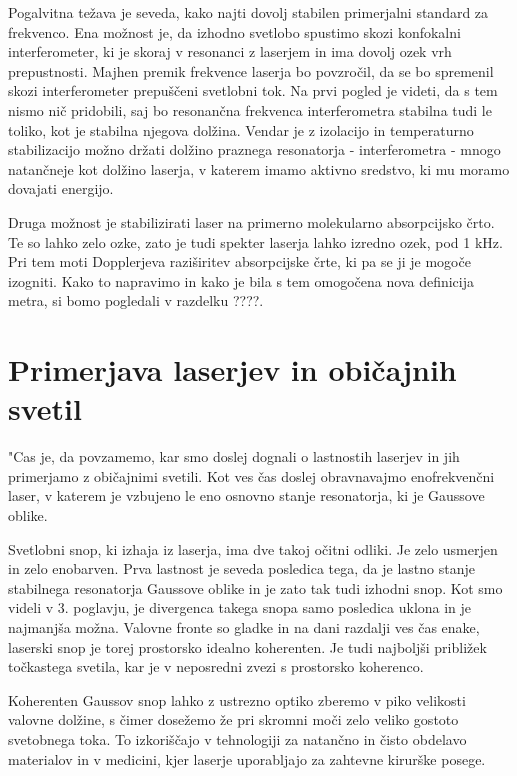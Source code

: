 Pogalvitna težava je seveda, kako najti dovolj stabilen primerjalni
standard za frekvenco. Ena možnost je, da izhodno svetlobo spustimo skozi
konfokalni interferometer, ki je skoraj v resonanci z laserjem in ima dovolj
ozek vrh prepustnosti. Majhen premik frekvence laserja bo povzročil, da se
bo spremenil skozi interferometer prepuščeni svetlobni tok. Na prvi pogled
je videti, da s tem nismo nič pridobili, saj bo resonančna frekvenca
interferometra stabilna tudi le toliko, kot je stabilna njegova dolžina.
Vendar je z izolacijo in temperaturno stabilizacijo možno držati dolžino
praznega resonatorja - interferometra - mnogo natančneje kot dolžino
laserja, v katerem imamo aktivno sredstvo, ki mu moramo dovajati energijo.

Druga možnost je stabilizirati laser na primerno molekularno absorpcijsko
črto. Te so lahko zelo ozke, zato je tudi spekter laserja lahko izredno
ozek, pod 1 kHz. Pri tem moti Dopplerjeva raziširitev absorpcijske črte,
ki pa se ji je mogoče izogniti. Kako to napravimo in kako je bila s tem
omogočena nova definicija metra, si bomo pogledali v razdelku ????.

\section{Primerjava laserjev in običajnih svetil}

"Cas je, da povzamemo, kar smo doslej dognali o lastnostih laserjev in jih
primerjamo z običajnimi svetili. Kot ves čas doslej obravnavajmo
enofrekvenčni laser, v katerem je vzbujeno le eno osnovno stanje
resonatorja, ki je Gaussove oblike.

Svetlobni snop, ki izhaja iz laserja, ima dve takoj očitni odliki. Je zelo
usmerjen in zelo enobarven. Prva lastnost je seveda posledica tega, da je
lastno stanje stabilnega resonatorja Gaussove oblike in je zato tak tudi
izhodni snop. Kot smo videli v 3. poglavju, je divergenca takega snopa samo
posledica uklona in je najmanjša možna. Valovne fronte so gladke in na
dani razdalji ves čas enake, laserski snop je torej prostorsko idealno
koherenten. Je tudi najboljši približek točkastega svetila, kar je v
neposredni zvezi s prostorsko koherenco.

Koherenten Gaussov snop lahko z ustrezno optiko zberemo v piko velikosti
valovne dolžine, s čimer dosežemo že pri skromni moči zelo veliko
gostoto svetobnega toka. To izkoriščajo v tehnologiji za natančno in
čisto obdelavo materialov in v medicini, kjer laserje uporabljajo za
zahtevne kirurške posege.

